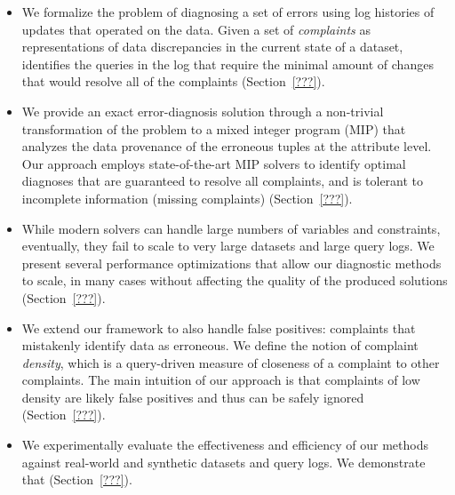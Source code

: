 
\begin{itemize}[leftmargin=*, topsep=0mm, itemsep=0mm]      
    \item We formalize the problem of diagnosing a set of errors using log
    histories of updates that operated on the data. Given a set of 
    \emph{complaints} as representations of data discrepancies in the current
    state of a dataset, \sys identifies the queries in the log that require the  minimal
    amount of changes that would resolve all of the complaints (Section~\ref{???}).
      
    \item We provide an exact error-diagnosis solution through a non-trivial
    transformation of the problem to a mixed integer program (MIP) that
    analyzes the data provenance of the erroneous tuples at the attribute
    level. Our approach employs state-of-the-art MIP solvers to identify
    optimal diagnoses that are guaranteed to resolve all complaints, and is
    tolerant to incomplete information (missing complaints)
    (Section~\ref{???}).
    
    \item While modern solvers can handle large numbers of variables and
    constraints, eventually, they fail to scale to very large datasets and
    large query logs. We present several performance optimizations that allow
    our diagnostic methods to scale, in many cases without affecting the
    quality of the produced solutions (Section~\ref{???}).
    
    \item We extend our framework to also handle false positives: complaints
    that mistakenly identify data as erroneous. We define the notion of
    complaint \emph{density}, which is a query-driven measure of closeness of
    a complaint to other complaints. The main intuition of our approach is
    that complaints of low density are likely false positives and thus can be
    safely ignored (Section~\ref{???}).
    
    \item We experimentally evaluate the effectiveness and efficiency of our
    methods against real-world and synthetic datasets and query logs. We
    demonstrate that 
    (Section~\ref{???}). 
\end{itemize}



